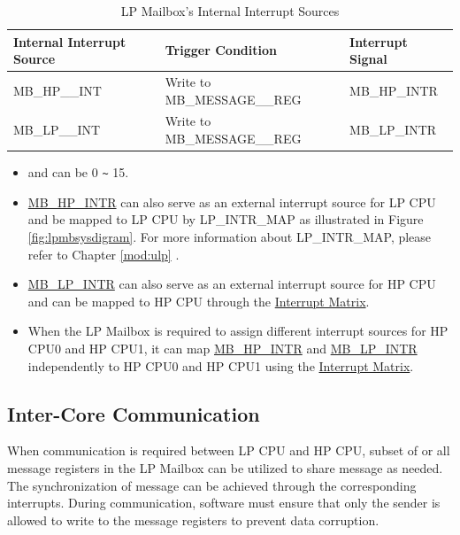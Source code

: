 \documentclass[main\_\_EN.tex]{subfiles}
\begin{document}
\begin{longtable}{ | L{5cm} | L{6.5cm} | L{4cm} | }
\caption{LP Mailbox's Internal Interrupt Sources} \label{tab:lpmailbox-int-sources}
\\ \hline
{}
\textbf{Internal Interrupt Source} & \textbf{Trigger Condition}  &  \textbf{Interrupt Signal}\\ \hline
\label{int:MBHPmINT} MB\_HP\_\_INT &  Write to MB\_MESSAGE\_\_REG &  MB\_HP\_INTR  \\ \hline
\label{int:MBLPnINT} MB\_LP\_\_INT &  Write to MB\_MESSAGE\_\_REG &  MB\_LP\_INTR  \\ \hline
\end{longtable}
\begin{tiplisting}
\vspace{-2em}
\begin{itemize}
    \item {} and  can be 0 \verb+~+ 15.
    \item\hyperref[tab:lpmailbox-int-sources]{MB\_HP\_INTR} can also serve as an external interrupt source for LP CPU and be mapped to LP CPU by LP\_INTR\_MAP as illustrated in Figure \ref{fig:lpmbsysdigram}. For more information about LP\_INTR\_MAP, please refer to Chapter \ref{mod:ulp} \textit{}.
    \item\hyperref[tab:lpmailbox-int-sources]{MB\_LP\_INTR} can also serve as an external interrupt source for HP CPU and can be mapped to HP CPU through the \hyperref[mod:intmtrx]{Interrupt Matrix}.
    \item When the LP Mailbox is required to assign different interrupt sources for HP CPU0 and HP CPU1, it can map \hyperref[tab:lpmailbox-int-sources]{MB\_HP\_INTR} and  \hyperref[tab:lpmailbox-int-sources]{MB\_LP\_INTR} independently to HP CPU0 and HP CPU1 using the \hyperref[mod:intmtrx]{Interrupt Matrix}.
\end{itemize}
\end{tiplisting}

\subsection{Inter-Core Communication}
When communication is required between LP CPU and HP CPU, subset of or all message registers in the LP Mailbox can be utilized to share message as needed. The synchronization of message can be achieved through the corresponding interrupts. During communication, software must ensure that only the sender is allowed to write to the message registers to prevent data corruption.
\end{document}
